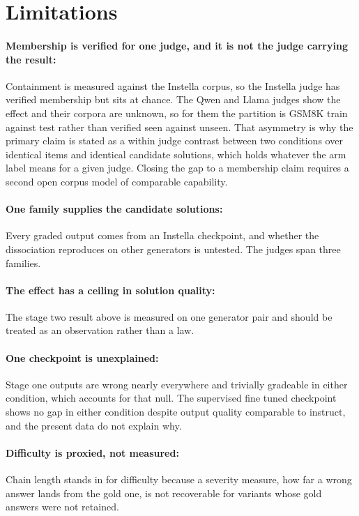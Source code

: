 \documentclass{article}
\begin{document}
\section{Limitations}
\label{sec:limits}

\paragraph{Membership is verified for one judge, and it is not the judge carrying the
result:} Containment is measured against the Instella corpus, so the Instella judge has
verified membership but sits at chance. The Qwen and Llama judges show the effect and their
corpora are unknown, so for them the partition is GSM8K train against test rather than
verified seen against unseen. That asymmetry is why the primary claim is stated as a within
judge contrast between two conditions over identical items and identical candidate
solutions, which holds whatever the arm label means for a given judge. Closing the gap to a
membership claim requires a second open corpus model of comparable capability.

\paragraph{One family supplies the candidate solutions:} Every graded output comes from an
Instella checkpoint, and whether the dissociation reproduces on other generators is untested.
The judges span three families.

\paragraph{The effect has a ceiling in solution quality:} The stage two result above is
measured on one generator pair and should be treated as an observation rather than a law.

\paragraph{One checkpoint is unexplained:} Stage one outputs are wrong nearly everywhere and
trivially gradeable in either condition, which accounts for that null. The supervised fine
tuned checkpoint shows no gap in either condition despite output quality comparable to
instruct, and the present data do not explain why.

\paragraph{Difficulty is proxied, not measured:} Chain length stands in for difficulty
because a severity measure, how far a wrong answer lands from the gold one, is not recoverable
for variants whose gold answers were not retained.
\end{document}
